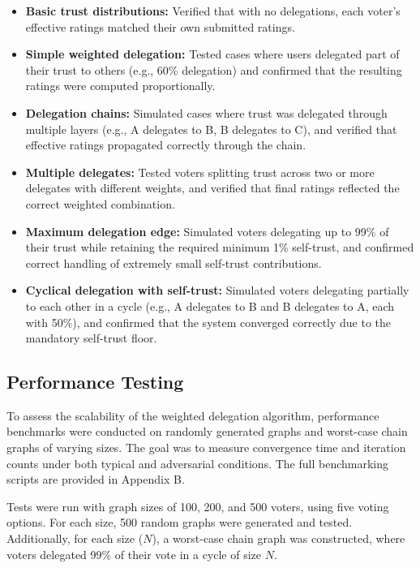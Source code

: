 \begin{itemize}
\item\textbf{Basic trust distributions:} Verified that with no delegations, each voter's effective ratings matched their own submitted ratings.

\item\textbf{Simple weighted delegation:} Tested cases where users delegated part of their trust to others (e.g., 60\% delegation) and confirmed that the resulting ratings were computed proportionally.

\item\textbf{Delegation chains:} Simulated cases where trust was delegated through multiple layers (e.g., A delegates to B, B delegates to C), and verified that effective ratings propagated correctly through the chain.

\item\textbf{Multiple delegates:} Tested voters splitting trust across two or more delegates with different weights, and verified that final ratings reflected the correct weighted combination.

\item\textbf{Maximum delegation edge:} Simulated voters delegating up to 99\% of their trust while retaining the required minimum 1\% self-trust, and confirmed correct handling of extremely small self-trust contributions.

\item\textbf{Cyclical delegation with self-trust:} Simulated voters delegating partially to each other in a cycle (e.g., A delegates to B and B delegates to A, each with 50\%), and confirmed that the system converged correctly due to the mandatory self-trust floor.
\end{itemize}



\subsection{Performance Testing}
To assess the scalability of the weighted delegation algorithm, performance benchmarks were conducted on randomly generated graphs and worst-case chain graphs of varying sizes. The goal was to measure convergence time and iteration counts under both typical and adversarial conditions. The full benchmarking scripts are provided in Appendix B.

Tests were run with graph sizes of 100, 200, and 500 voters, using five voting options. For each size, 500 random graphs were generated and tested. Additionally, for each size ($N$), a worst-case chain graph was constructed, where voters delegated 99\% of their vote in a cycle of size $N$.

